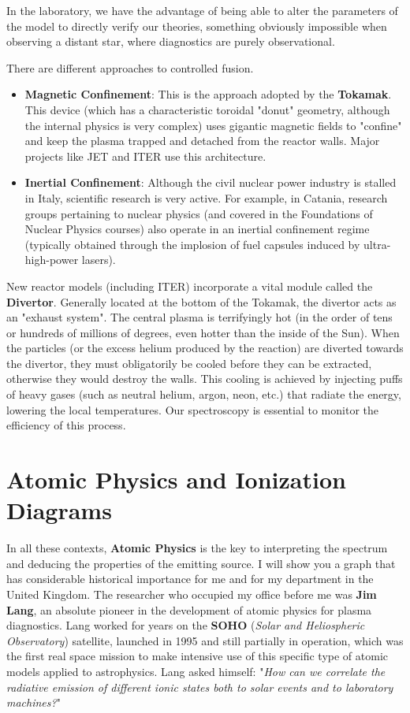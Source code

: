 In the laboratory, we have the advantage of being able to alter the parameters of the model to directly verify our theories, something obviously impossible when observing a distant star, where diagnostics are purely observational.

There are different approaches to controlled fusion.

\begin{itemize}
    \item \textbf{Magnetic Confinement}: This is the approach adopted by the \textbf{Tokamak}. This device (which has a characteristic toroidal "donut" geometry, although the internal physics is very complex) uses gigantic magnetic fields to "confine" and keep the plasma trapped and detached from the reactor walls. Major projects like JET and ITER use this architecture.
    \item \textbf{Inertial Confinement}: Although the civil nuclear power industry is stalled in Italy, scientific research is very active. For example, in Catania, research groups pertaining to nuclear physics (and covered in the Foundations of Nuclear Physics courses) also operate in an inertial confinement regime (typically obtained through the implosion of fuel capsules induced by ultra-high-power lasers).
\end{itemize}

New reactor models (including ITER) incorporate a vital module called the \textbf{Divertor}. Generally located at the bottom of the Tokamak, the divertor acts as an "exhaust system". The central plasma is terrifyingly hot (in the order of tens or hundreds of millions of degrees, even hotter than the inside of the Sun). When the particles (or the excess helium produced by the reaction) are diverted towards the divertor, they must obligatorily be cooled before they can be extracted, otherwise they would destroy the walls. This cooling is achieved by injecting puffs of heavy gases (such as neutral helium, argon, neon, etc.) that radiate the energy, lowering the local temperatures. Our spectroscopy is essential to monitor the efficiency of this process.

\section{Atomic Physics and Ionization Diagrams}

In all these contexts, \textbf{Atomic Physics} is the key to interpreting the spectrum and deducing the properties of the emitting source.
I will show you a graph that has considerable historical importance for me and for my department in the United Kingdom. The researcher who occupied my office before me was \textbf{Jim Lang}, an absolute pioneer in the development of atomic physics for plasma diagnostics. Lang worked for years on the \textbf{SOHO} (\textit{Solar and Heliospheric Observatory}) satellite, launched in 1995 and still partially in operation, which was the first real space mission to make intensive use of this specific type of atomic models applied to astrophysics.
Lang asked himself: "\textit{How can we correlate the radiative emission of different ionic states both to solar events and to laboratory machines?}"


